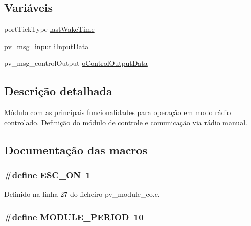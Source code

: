 \subsection*{Variáveis}
\begin{DoxyCompactItemize}
\item 
port\-Tick\-Type \hyperlink{group__Module__RC_gaa8db3871cb5f64abbd94ddd5a1db73a6}{last\-Wake\-Time}
\item 
pv\-\_\-msg\-\_\-input \hyperlink{group__Module__RC_gac40b8cfe5fd2000670ad57fe3e75ec89}{i\-Input\-Data}
\item 
pv\-\_\-msg\-\_\-control\-Output \hyperlink{group__Module__RC_ga0a14ca4568444d2d76c256fa91585cdf}{o\-Control\-Output\-Data}
\end{DoxyCompactItemize}


\subsection{Descrição detalhada}
Módulo com as principais funcionalidades para operação em modo rádio controlado. Definição do módulo de controle e comunicação via rádio manual. 

\subsection{Documentação das macros}
\hypertarget{group__Module__RC_gaec8246e954743c1eca3ed9d0b934bf8e}{
\subsubsection[{E\-S\-C\-\_\-\-O\-N}]{\setlength{\rightskip}{0pt plus 5cm}\#define E\-S\-C\-\_\-\-O\-N~1}}\label{group__Module__RC_gaec8246e954743c1eca3ed9d0b934bf8e}


Definido na linha 27 do ficheiro pv\-\_\-module\-\_\-co.\-c.

\hypertarget{group__Module__RC_ga0ac6c9f2991b096e49c354e5cce6fae0}{
\subsubsection[{M\-O\-D\-U\-L\-E\-\_\-\-P\-E\-R\-I\-O\-D}]{\setlength{\rightskip}{0pt plus 5cm}\#define M\-O\-D\-U\-L\-E\-\_\-\-P\-E\-R\-I\-O\-D~10}}\label{group__Module__RC_ga0ac6c9f2991b096e49c354e5cce6fae0}


